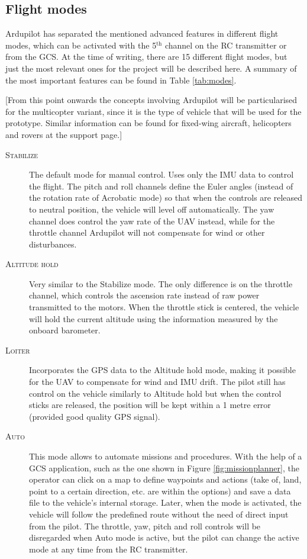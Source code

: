 \subsection{Flight modes}

Ardupilot has separated the mentioned advanced features in different flight modes, which can be activated with the 5$^{\text{th}}$ channel on the RC transmitter or from the GCS.
At the time of writing, there are 15 different flight modes, but just the most relevant ones for the project will be described here.
A summary of the most important features can be found in Table \ref{tab:modes}.

\noindent \small{[From this point onwards the concepts involving Ardupilot will be particularised for the multicopter variant, since it is the type of vehicle that will be used for the prototype.
Similar information can be found for fixed-wing aircraft, helicopters and rovers at the support page.]

\begin{description}

	\item[\scshape Stabilize] 
		The default mode for manual control.
		Uses only the IMU data to control the flight.
		The pitch and roll channels define the Euler angles (instead of the rotation rate of Acrobatic mode) so that when the controls are released to neutral position, the vehicle will level off automatically.
		The yaw channel does control the yaw rate of the UAV instead, while for the throttle channel
		Ardupilot will not compensate for wind or other disturbances.

	\item[\scshape Altitude hold]
		Very similar to the Stabilize mode.
		The only difference is on the throttle channel, which controls the ascension rate instead of raw power transmitted to the motors.
		When the throttle stick is centered, the vehicle will hold the current altitude using the information measured by the onboard barometer.

	\item[\scshape Loiter]
		Incorporates the GPS data to the Altitude hold mode, making it possible for the UAV to compensate for wind and IMU drift.
		The pilot still has control on the vehicle similarly to Altitude hold but when the control sticks are released, the position will be kept within a 1 metre error (provided good quality GPS signal).

	\item[\scshape Auto]
		This mode allows to automate missions and procedures.
		With the help of a GCS application, such as the one shown in Figure \ref{fig:missionplanner}, the operator can click on a map to define waypoints and actions (take of, land, point to a certain direction, etc. are within the options) and save a data file to the vehicle's internal storage.
		Later, when the mode is activated, the vehicle will follow the predefined route without the need of direct input from the pilot.
		The throttle, yaw, pitch and roll controls will be disregarded when Auto mode is active, but the pilot can change the active mode at any time from the RC transmitter.


\end{description}}
